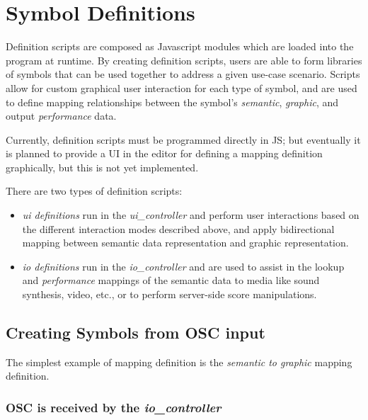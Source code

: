 \documentclass{article}
\def\uicontroller{\textit{ui\_controller}\xspace}
\def\iocontroller{\textit{io\_controller}\xspace}
\begin{document}
\section{Symbol Definitions}\label{library_definitions_api}

Definition scripts are composed as Javascript modules which are loaded into the program at runtime.
By creating definition scripts, users are able to form libraries of symbols that can be used together to address a given use-case scenario.
Scripts allow for custom graphical user interaction for each type of symbol, and are used to define mapping relationships between the symbol's \textit{semantic}, \textit{graphic}, and output \textit{performance} data.

Currently, definition scripts must be programmed directly in JS; but eventually it is planned to provide a UI in the editor for defining a mapping definition graphically, but this is not yet implemented.

There are two types of definition scripts:
\begin{itemize}\itemsep0pt 
\item \textit{ui definitions} run in the \uicontroller and perform user interactions based on the different interaction modes described above, and apply bidirectional mapping between semantic data representation and graphic representation.
\item \textit{io definitions} run in the \iocontroller and are used to assist in the lookup and \textit{performance} mappings of the semantic data to media like sound synthesis, video, etc., or to perform server-side score manipulations.
\end{itemize}


\subsection{Creating Symbols from OSC input}

The simplest example of mapping definition is the \textit{semantic to graphic} mapping definition.

\subsubsection{OSC is received by the \iocontroller}
\end{document}
